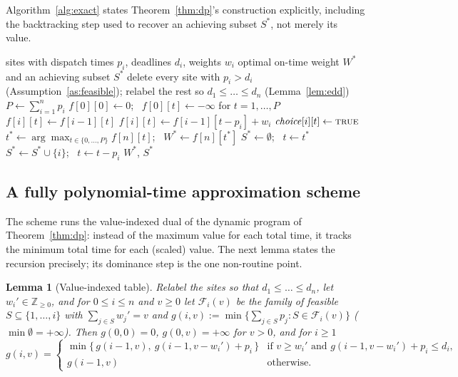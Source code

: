 \documentclass[pdflatex,sn-mathphys-ay]{sn-jnl}
\theoremstyle{thmstyleone}
\newtheorem{lemma}[theorem]{Lemma}
\theoremstyle{thmstyletwo}
\theoremstyle{thmstylethree}
\begin{document}
Algorithm~\ref{alg:exact} states Theorem~\ref{thm:dp}'s construction
explicitly, including the backtracking step used to recover an
achieving subset $S^\ast$, not merely its value.

\begin{algorithm}
\caption{Exact dynamic program for MWHED (Theorem~\ref{thm:dp})}\label{alg:exact}
\begin{algorithmic}[1]
\Require sites with dispatch times $p_i$, deadlines $d_i$, weights $w_i$
\Ensure optimal on-time weight $W^\ast$ and an achieving subset $S^\ast$
\State delete every site with $p_i > d_i$ (Assumption~\ref{as:feasible}); relabel the rest so $d_1 \le \dots \le d_n$ (Lemma~\ref{lem:edd})
\State $P \gets \sum_{i=1}^n p_i$
\State $f[0][0] \gets 0$; \ $f[0][t] \gets -\infty$ for $t=1,\dots,P$
    \State $f[i][t] \gets f[i-1][t]$ 
        \State $f[i][t] \gets f[i-1][t-p_i] + w_i$
        \State $\mathit{choice}[i][t] \gets \textsc{true}$ 
      \EndIf
    \EndIf
  \EndFor
\EndFor
\State $t^\ast \gets \arg\max_{t \in \{0,\dots,P\}} f[n][t]$; \ $W^\ast \gets f[n][t^\ast]$
\State $S^\ast \gets \emptyset$; \ $t \gets t^\ast$
 
    \State $S^\ast \gets S^\ast \cup \{i\}$; \ $t \gets t - p_i$
  \EndIf
\EndFor
\State \Return $W^\ast$, $S^\ast$
\end{algorithmic}
\end{algorithm}

\subsection{A fully polynomial-time approximation scheme}

The scheme runs the value-indexed dual of the dynamic program of
Theorem~\ref{thm:dp}: instead of the maximum value for each total time,
it tracks the minimum total time for each (scaled) value. The next lemma
states the recursion precisely; its dominance step is the one non-routine
point.

\begin{lemma}[Value-indexed table]\label{lem:g}
Relabel the sites so that $d_1\le\dots\le d_n$, let $w_i'\in\mathbb Z_{\ge0}$,
and for $0\le i\le n$ and $v\ge0$ let $\mathcal F_i(v)$ be the family of
feasible $S\subseteq\{1,\dots,i\}$ with $\sum_{j\in S}w_j'=v$ and
$g(i,v):=\min\{\sum_{j\in S}p_j:S\in\mathcal F_i(v)\}$
($\min\emptyset=+\infty$). Then $g(0,0)=0$, $g(0,v)=+\infty$ for $v>0$, and
for $i\ge1$
\begin{equation}\label{eq:g}
g(i,v)=\begin{cases}
\min\{\,g(i-1,v),\ g(i-1,v-w_i')+p_i\,\} & \text{if } v\ge w_i' \text{ and } g(i-1,v-w_i')+p_i\le d_i,\\[2pt]
g(i-1,v) & \text{otherwise.}
\end{cases}
\end{equation}
\end{lemma}
\end{document}
